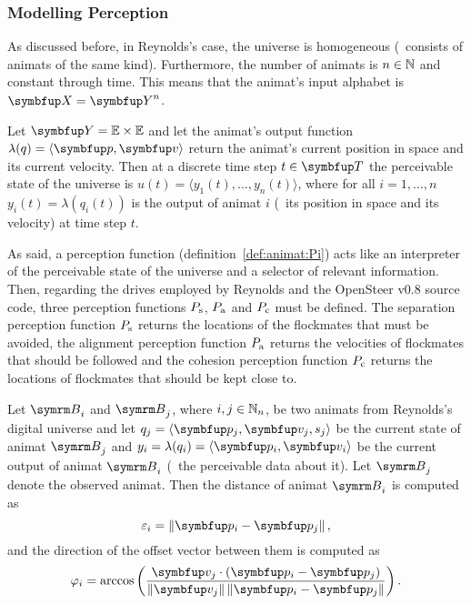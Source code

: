 \subsubsection{Modelling Perception}
As discussed before, in Reynolds's case, the universe is homogeneous (\ie\ consists of animats of the same kind). Furthermore, the number of animats is $n \in \mathbb{N}$ and constant through time. This means that the animat's input alphabet is $\set{X}=\set{Y}^n$. 

Let $\set{Y}=\E \times \E$ and let the animat's output function $\lambda(q)=\langle\vect{p},\vect{v}\rangle$ return the animat's current position in space and its current velocity. Then at a discrete time step $t \in \set{T}$ the perceivable state of the universe is $u(t)=\langle y_1(t),\ldots,y_n(t)\rangle$, where for all $i=1,\ldots,n$ $y_i(t)=\lambda(q_i(t))$ is the output of animat $i$ (\ie\ its position in space and its velocity) at time step $t$. 

As said, a perception function (definition~\ref{def:animat:Pi}) acts like an interpreter of the perceivable state of the universe and a selector of relevant information. Then, regarding the drives employed by Reynolds and the OpenSteer v0.8 source code, three perception functions $P_\textnormal{s}$, $P_\textnormal{a}$ and $P_\textnormal{c}$ must be defined. The separation perception function $P_\textnormal{s}$ returns the locations of the flockmates that must be avoided, the alignment perception function $P_\textnormal{a}$ returns the velocities of flockmates that should be followed and the cohesion perception function $P_\textnormal{c}$ returns the locations of flockmates that should be kept close to. 

Let $\autom{B}_i$ and $\autom{B}_j$, where $i,j \in \mathbb{N}_n$, be two animats from Reynolds's digital universe and let $q_j=\langle\vect{p}_j,\vect{v}_j,s_j\rangle$ be the current state of animat $\autom{B}_j$ and $y_i=\lambda(q_i)=\langle \vect{p}_i,\vect{v}_i \rangle$ be the current output of animat $\autom{B}_i$ (\ie\ the perceivable data about it). Let $\autom{B}_j$ denote the observed animat. Then the distance of animat $\autom{B}_i$ is computed as
%
\begin{equation}
	\varepsilon_i=\left\|\vect{p}_i - \vect{p}_j\right\|, \label{eq:animat:cwr:distance}
\end{equation}
%
and the direction of the offset vector between them is computed as
%
\begin{equation}
	\varphi_i=\arccos \left( \frac {\vect{v}_j \cdot (\vect{p}_i - \vect{p}_j)}{\left\| \vect{v}_j \right\| \left\| \vect{p}_i - \vect{p}_j \right\|} \right). \label{eq:animat:cwr:angularOffset}
\end{equation}

